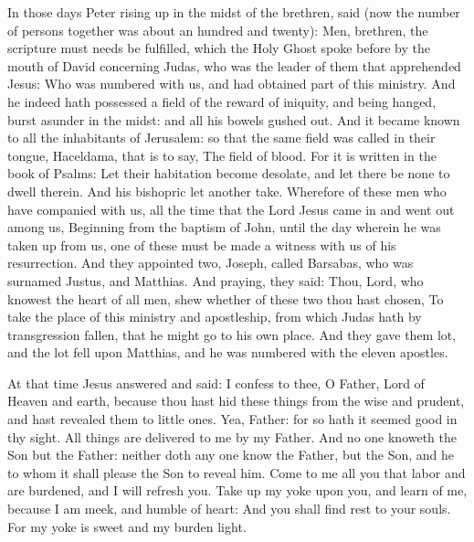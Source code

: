 
In those days Peter rising up in the midst of the brethren, said
(now the number of persons together was about an hundred and twenty):
Men, brethren, the scripture must needs be fulfilled, which the
Holy Ghost spoke before by the mouth of David concerning Judas, who was
the leader of them that apprehended Jesus:
Who was numbered with us, and had obtained part of this ministry.
And he indeed hath possessed a field of the reward of iniquity,
and being hanged, burst asunder in the midst: and all his bowels gushed
out.
And it became known to all the inhabitants of Jerusalem: so that
the same field was called in their tongue, Haceldama, that is to say,
The field of blood.
For it is written in the book of Psalms: Let their habitation
become desolate, and let there be none to dwell therein. And his
bishopric let another take.
Wherefore of these men who have companied with us, all the time
that the Lord Jesus came in and went out among us,
Beginning from the baptism of John, until the day wherein he was
taken up from us, one of these must be made a witness with us of his
resurrection.
And they appointed two, Joseph, called Barsabas, who was surnamed
Justus, and Matthias.
And praying, they said: Thou, Lord, who knowest the heart of all
men, shew whether of these two thou hast chosen,
To take the place of this ministry and apostleship, from which
Judas hath by transgression fallen, that he might go to his own place.
And they gave them lot, and the lot fell upon Matthias, and he was
numbered with the eleven apostles.

\medskip


At that time Jesus answered and said: I confess to thee, O
Father, Lord of Heaven and earth, because thou hast hid these things
from the wise and prudent, and hast revealed them to little ones.
Yea, Father: for so hath it seemed good in thy sight.
All things are delivered to me by my Father. And no one knoweth
the Son but the Father: neither doth any one know the Father, but the
Son, and he to whom it shall please the Son to reveal him.
Come to me all you that labor and are burdened, and I will
refresh you.
Take up my yoke upon you, and learn of me, because I am meek, and
humble of heart: And you shall find rest to your souls.
For my yoke is sweet and my burden light.



\bigskip
\columnbreak


